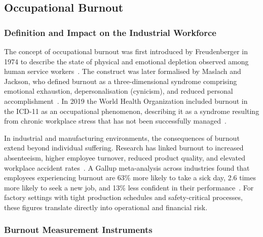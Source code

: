 \documentclass[12pt,a4paper]{article}
\begin{document}
\subsection{Occupational Burnout}

\subsubsection{Definition and Impact on the Industrial Workforce}

The concept of occupational burnout was first introduced by Freudenberger
in 1974 to describe the state of physical and emotional depletion observed
among human service workers~\cite{freudenberger1974}. The construct was
later formalised by Maslach and Jackson, who defined burnout as a
three-dimensional syndrome comprising emotional exhaustion,
depersonalisation (cynicism), and reduced personal
accomplishment~\cite{maslach1981}. In 2019 the World Health Organization
included burnout in the ICD-11 as an occupational phenomenon, describing it
as a syndrome resulting from chronic workplace stress that has not been
successfully managed~\cite{who2019}.

In industrial and manufacturing environments, the consequences of burnout
extend beyond individual suffering. Research has linked burnout to
increased absenteeism, higher employee turnover, reduced product quality,
and elevated workplace accident rates~\cite{ahola2017}. A Gallup
meta-analysis across industries found that employees experiencing burnout
are 63\% more likely to take a sick day, 2.6 times more likely to seek a
new job, and 13\% less confident in their performance~\cite{gallup2024}.
For factory settings with tight production schedules and safety-critical
processes, these figures translate directly into operational and financial
risk.

\subsubsection{Burnout Measurement Instruments}
\end{document}
